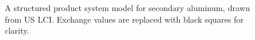 \begin{figure}

  \caption{A structured product system model for secondary aluminum, drawn from US LCI. Exchange values are replaced with black squares for clarity.}
  \label{table:aluminum}
\end{figure}
